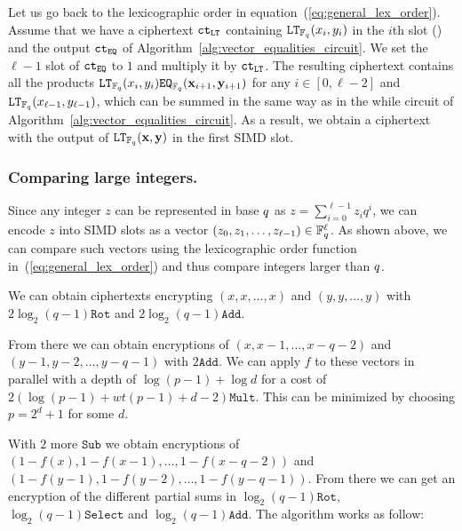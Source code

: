   Let us go back to the lexicographic order in equation~(\ref{eq:general_lex_order}).
  Assume that we have a ciphertext ${\mathtt{ct}}_{\mathtt{LT}}$ containing $\mathtt{LT}_{\mathbb{F}_q}(x_i, y_i)$ in the $i$th slot () and the output ${\mathtt{ct}}_{\mathtt{EQ}}$ of Algorithm~\ref{alg:vector_equalities_circuit}.
  We set the $\ell-1$ slot of ${\mathtt{ct}}_{\mathtt{EQ}}$ to $1$ and multiply it by ${\mathtt{ct}}_{\mathtt{LT}}$.
  The resulting ciphertext contains all the products $\mathtt{LT}_{\mathbb{F}_q}(x_{i}, y_{i}) \mathtt{EQ}_{\mathbb{F}_q}(\mathbf{x}_{i+1}, \mathbf{y}_{i+1})$ for any $i \in [0,\ell-2]$ and $\mathtt{LT}_{\mathbb{F}_q}(x_{\ell-1}, y_{\ell-1})$, which can be summed in the same way as in the while circuit of Algorithm~\ref{alg:vector_equalities_circuit}.
  As a result, we obtain a ciphertext with the output of $\mathtt{LT}_{\mathbb{F}_q}(\mathbf{x}, \mathbf{y})$ in the first SIMD slot.

  \subsubsection{Comparing large integers.}
  Since any integer $z$ can be represented in base $q$ as $z = \sum_{i=0}^{\ell-1} z_i q^i$, we can encode $z$ into SIMD slots as a vector $(z_0,z_1,\dots,z_{\ell-1}) \in \mathbb{F}_{q}^\ell$.
  As shown above, we can compare such vectors using the lexicographic order function in~(\ref{eq:general_lex_order}) and thus compare integers larger than $q$.

  We can obtain ciphertexts encrypting $(x,x,\ldots, x)$ and $(y,y,\ldots, y)$ with $2\log_2(q-1)\texttt{Rot}$ and $2\log_2(q-1)\texttt{Add}$. 

  From there we can obtain encryptions of $(x,x-1,\ldots, x-q-2)$ and $(y-1,y-2,\ldots, y-q-1)$ with $2\texttt{Add}$. We can apply $f$ to these vectors in parallel with a depth of $\log (p-1) + \log d$ for a cost of $2(\log (p-1) + wt(p-1) + d - 2) \texttt{Mult}$. This can be minimized by choosing $p = 2^d + 1$ for some $d$.

  With $2$ more $\texttt{Sub}$ we obtain encryptions of $(1-f(x), 1-f(x-1), \ldots, 1-f(x-q-2))$ and $(1-f(y-1), 1-f(y-2), \ldots, 1-f(y-q-1))$. From there we can get an encryption of the different partial sums in $\log_2(q-1)\texttt{Rot}$, $\log_2(q-1)\texttt{Select}$ and $\log_2(q-1)\texttt{Add}$. The algorithm works as follow:

